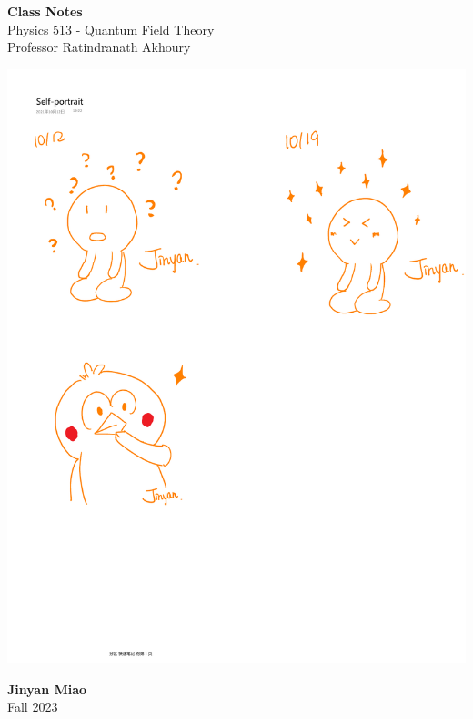\documentclass[11pt, onesided]{book}
\theoremstyle{break}
\theoremstyle{break}
\begin{document}
	\begin{titlepage}
		\begin{center}
			\vspace*{0.5cm}
			\Huge \color{red}
				\textbf{Class Notes}\\
			\vspace{0.5cm}			
			\Large \color{black}
			Physics 513 - Quantum Field Theory\\
			Professor Ratindranath Akhoury
			\vspace{1.5cm}

			\includegraphics[scale=1.15]{hmm.pdf}
			
			
			\vspace{2cm}
			\LARGE
				\textbf{Jinyan Miao}\\
				\hfill\break
				\LARGE Fall 2023\\
			\vspace{1cm}

		\vspace*{\fill}
		\end{center}			
	\end{titlepage}
\end{document}
